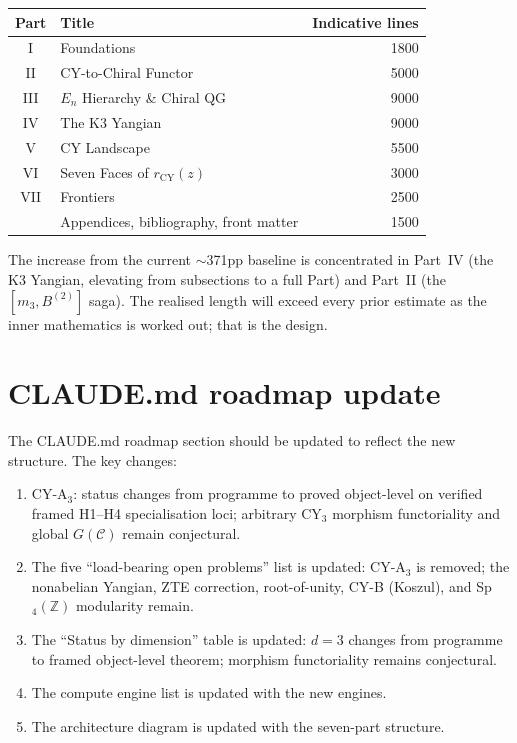 \documentclass[11pt]{article}
\newcommand{\CY}{\mathrm{CY}}
\newcommand{\En}{E_n}
\newcommand{\Z}{\mathbb{Z}}
\begin{document}
\begin{center}
\renewcommand{\arraystretch}{1.1}
\begin{tabular}{clr}
\toprule
Part & Title & Indicative lines \\
\midrule
I & Foundations & 1800 \\
II & CY-to-Chiral Functor & 5000 \\
III & $\En$ Hierarchy \& Chiral QG & 9000 \\
IV & The K3 Yangian & 9000 \\
V & CY Landscape & 5500 \\
VI & Seven Faces of $r_{\CY}(z)$ & 3000 \\
VII & Frontiers & 2500 \\
\midrule
 & Appendices, bibliography, front matter & 1500 \\
\bottomrule
\end{tabular}
\end{center}

The increase from the current $\sim$371pp baseline is concentrated in
Part~IV (the K3 Yangian, elevating from subsections to a full Part)
and Part~II (the $[m_3, B^{(2)}]$ saga). The realised length will
exceed every prior estimate as the inner mathematics is worked out;
that is the design.


\section{CLAUDE.md roadmap update}

The CLAUDE.md roadmap section should be updated to reflect the new
structure. The key changes:

\begin{enumerate}[label=(\arabic*)]
\item CY-A$_3$: status changes from programme to proved object-level on
 verified framed H1--H4 specialisation loci; arbitrary CY$_3$ morphism
 functoriality and global $G(\mathcal C)$ remain conjectural.
\item The five ``load-bearing open problems'' list is updated:
 CY-A$_3$ is removed; the nonabelian Yangian, ZTE correction,
 root-of-unity, CY-B (Koszul), and Sp$_4(\Z)$ modularity remain.
\item The ``Status by dimension'' table is updated:
 $d=3$ changes from programme to framed object-level theorem; morphism
 functoriality remains conjectural.
\item The compute engine list is updated with the new engines.
\item The architecture diagram is updated with the seven-part structure.
\end{enumerate}
\end{document}
